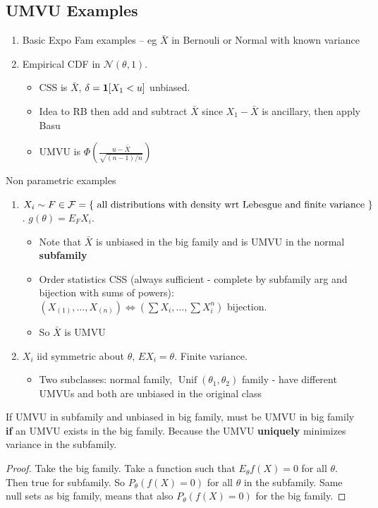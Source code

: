 \documentclass{article}
\newcommand{\Unif}{\operatorname{Unif}}
\begin{document}
\subsection{UMVU Examples}
\begin{enumerate}
	\item Basic Expo Fam examples -- eg $\bar X$ in Bernouli or Normal with known variance 
	\item Empirical CDF in $\mathcal N(\theta,1)$.
	\begin{itemize}
		\item CSS is $\bar X$, $\delta = \boldsymbol{1}[X_1 < u]$ unbiased. 
		\item Idea to RB then add and subtract $\bar X$ since $X_1 - \bar X$ is ancillary, then apply Basu
		\item UMVU is $\Phi(\frac{u - \bar X}{\sqrt{(n-1)/n}})$
	\end{itemize}

\end{enumerate}
Non parametric examples
\begin{enumerate}
	\item $X_i \sim F \in \mathcal F = \{ \text{ all distributions with density wrt Lebesgue and finite variance } \}$. $g(\theta) = E_F X_i$.
	\begin{itemize}
		\item Note that $\bar X$ is unbiased in the big family and is UMVU in the normal \textbf{subfamily} 
		\item Order statistics CSS (always sufficient - complete by subfamily arg and bijection with sums of powers): $(X_{(1)}, \ldots, X_{(n)}) \iff (\sum X_i, \ldots, \sum X_i^n)$ bijection. 
		\item So $\bar X$ is UMVU
	\end{itemize}
	\item $X_i$ iid symmetric about $\theta$, $E X_i = \theta$. Finite variance. 
	\begin{itemize}
		\item Two subclasses: normal family, $\Unif(\theta_1, \theta_2)$ family - have different UMVUs and both are unbiased in the original class
	\end{itemize}
\end{enumerate}
\begin{recipe}
If UMVU in subfamily and unbiased in big family, must be UMVU in big family \textbf{if} an  UMVU exists in the big family. Because the UMVU \textbf{uniquely} minimizes variance in the subfamily. 
\begin{proof}
	Take the big family. Take a function such that $E_\theta f(X) = 0$ for all $\theta$. Then true for subfamily. So $P_\theta (f(X) = 0)$ for all $\theta$ in the subfamily. Same null sets as big family, means that also $P_\theta (f(X) = 0)$ for the big family.
\end{proof}
\end{recipe}
\end{document}
